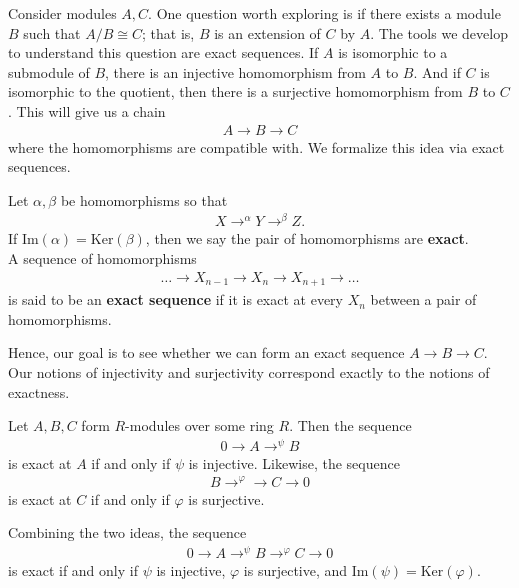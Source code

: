 \documentclass{memoir}
\begin{document}


Consider modules \(A,C\). One question worth exploring is if there exists a module \(B\) such that \(A / B \cong C\); that is, \(B\) is an extension of \(C\) by \(A\). The tools we develop to understand this question are exact sequences. If \(A\) is isomorphic to a submodule of \(B \), there is an injective homomorphism from \(A\) to \(B\). And if \(C\) is isomorphic to the quotient, then there is a surjective homomorphism from \(B\) to \(C\). This will give us a chain
\begin{align*}
	A \to B \to C
\end{align*}
where the homomorphisms are compatible with. We formalize this idea via exact sequences.

\begin{defn}
	Let \(\alpha ,\beta \) be homomorphisms so that
	\begin{align*}
		X \to^{\alpha } Y \to^{\beta }Z.
	\end{align*}
	If \(\textrm{Im}(\alpha ) = \textrm{Ker}(\beta )\), then we say the pair of homomorphisms are \textbf{exact}.\\

	A sequence of homomorphisms
	\begin{align*}
		\ldots \to X_{n-1} \to X_n \to X_{n+1} \to \ldots
	\end{align*}
	is said to be an \textbf{exact sequence} if it is exact at every \(X_n\) between a pair of homomorphisms.
\end{defn}
Hence, our goal is to see whether we can form an exact sequence \(A\to B\to C\). Our notions of injectivity and surjectivity correspond exactly to the notions of exactness.
\begin{prop}
	Let \(A,B,C\) form \(R\)-modules over some ring \(R\). Then the sequence
	\begin{align*}
		0 \to A \to^{\psi }B
	\end{align*}
	is exact at \(A\) if and only if \(\psi \) is injective. Likewise, the sequence
	\begin{align*}
		B \to^{\varphi }\to C \to 0
	\end{align*}
	is exact at \(C\) if and only if \(\varphi \) is surjective.
\end{prop}
Combining the two ideas, the sequence
\begin{align*}
	0 \to A \to^{\psi }B \to^{\varphi }C \to 0
\end{align*}
is exact if and only if \(\psi \) is injective, \(\varphi \) is surjective, and \(\textrm{Im}(\psi ) = \textrm{Ker}(\varphi )\).
\end{document}
